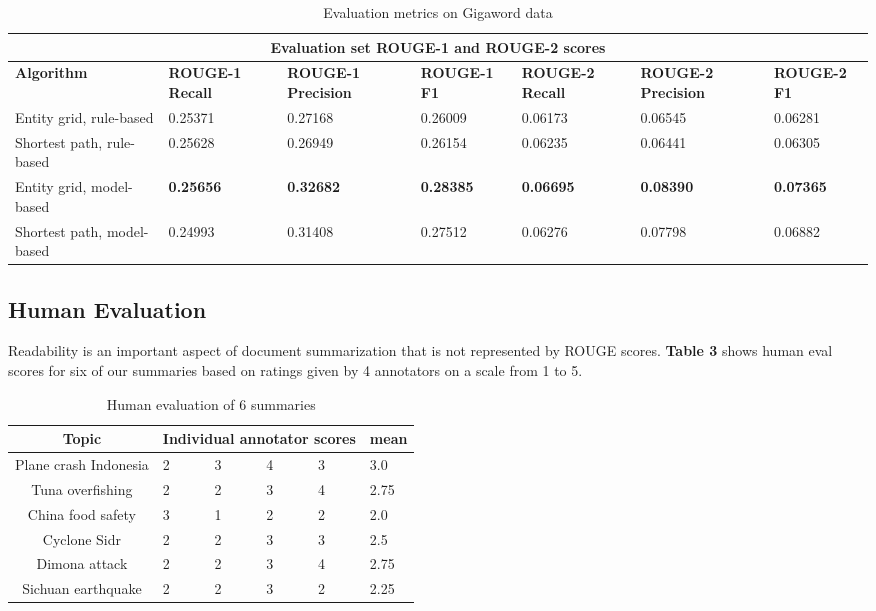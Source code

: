 \documentclass[11pt]{article}
\begin{document}
\begin{table*}[h]
\begin{tabular}{|p{4.3cm}||p{1.735cm}|p{1.78cm}|p{1.735cm}|p{1.735cm}|p{1.78cm}|p{1.735cm}| }
 \hline
 \multicolumn{7}{|c|}{Evaluation set ROUGE-1 and ROUGE-2 scores} \\
 \hline
 \textbf{Algorithm} & \textbf{ROUGE-1 Recall} & \textbf{ROUGE-1 Precision} & \textbf{ROUGE-1 F1} & \textbf{ROUGE-2 Recall} & \textbf{ROUGE-2 Precision} & \textbf{ROUGE-2 F1}\\
 \hline
Entity grid, rule-based & 0.25371 & 0.27168 & 0.26009 & 0.06173 & 0.06545 & 0.06281 \\
Shortest path, rule-based & 0.25628 & 0.26949 & 0.26154 & 0.06235 & 0.06441 & 0.06305 \\
Entity grid, model-based & \textbf{0.25656} & \textbf{0.32682} & \textbf{0.28385} & \textbf{0.06695} & \textbf{0.08390} & \textbf{0.07365} \\
Shortest path, model-based & 0.24993 & 0.31408 & 0.27512 & 0.06276 & 0.07798 & 0.06882 \\
\hline
\end{tabular}
\caption{Evaluation metrics on Gigaword data}
\label{tab:dev} 
\end{table*}

\subsection{Human Evaluation}
Readability is an important aspect of document summarization that is not represented by ROUGE scores. \textbf{Table 3} shows human eval scores for six of our summaries based on ratings given by 4 annotators on a scale from 1 to 5.

\begin{table*}[h]
	\centering
	\begin{tabular}{|c|p{1cm}|p{1cm}|p{1cm}|p{1cm}|p{1cm}|}
	\hline
		\textbf{Topic} & \multicolumn{4}{|c|}{\textbf{Individual annotator scores}} & \textbf{mean}\\
	\hline
	Plane crash Indonesia & 2 & 3 & 4 & 3 & 3.0\\
	\hline
	Tuna overfishing & 2 & 2 & 3 & 4 & 2.75\\
	\hline
	China food safety & 3 & 1 & 2 & 2 & 2.0\\
	\hline
	Cyclone Sidr & 2 & 2 & 3 & 3 & 2.5\\
	\hline
	Dimona attack & 2 & 2 & 3 & 4 & 2.75 \\
	\hline
	Sichuan earthquake & 2 & 2 & 3 & 2 & 2.25\\
	\hline
\end{tabular}
\caption{Human evaluation of 6 summaries}
\label{tab:dev}
\end{table*}
\end{document}

